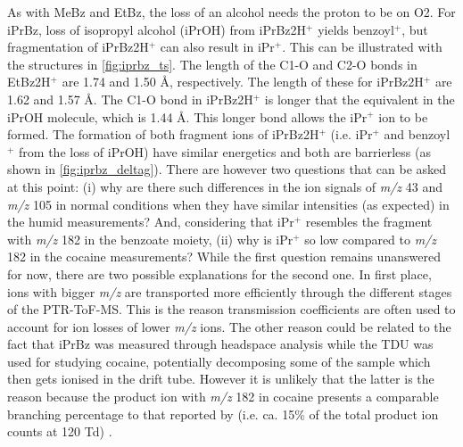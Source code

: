 

As with MeBz and EtBz, the loss of an alcohol needs the proton to be on O2.
%
For iPrBz, loss of isopropyl alcohol (iPrOH) from iPrBz2H$^+$ yields benzoyl$^+$, but fragmentation of iPrBz2H$^+$ can also result in iPr$^+$. 
%
This can be illustrated with the structures in \autoref{fig:iprbz_ts}.
%
The length of the C1-O and C2-O bonds in EtBz2H$^+$ are 1.74 and  1.50   \r{A}, respectively.
%
The length of these for iPrBz2H$^+$ are  1.62 and 1.57  \r{A}.
%
The C1-O bond in iPrBz2H$^+$ is longer that the equivalent in the iPrOH molecule, which is 1.44 \r{A}.
%
This longer bond allows the iPr$^+$ ion to be formed.
%
The formation of both fragment ions of iPrBz2H$^+$ (i.e. iPr$^+$ and benzoyl$^+$ from the loss of iPrOH) have similar energetics and both are barrierless (as shown in \autoref{fig:iprbz_deltag}).
%
There are however two questions that can be asked at this point:
%
(i) why are there such differences in the ion signals of \textit{m/z} 43 and \textit{m/z} 105 in normal conditions when they have similar intensities (as expected) in the humid measurements?
And, considering that  iPr$^+$ resembles the fragment with \textit{m/z} 182 in the benzoate moiety, (ii)  why is iPr$^+$ so low compared to \textit{m/z} 182 in the cocaine measurements?
%
While the first question remains unanswered for now, there are two possible explanations for the second one.
%
In first place, ions with bigger \textit{m/z} are transported more efficiently through the different stages of the PTR-ToF-MS.
%
This is the reason transmission coefficients are often used to account for ion losses of lower \textit{m/z} ions.
%
The other reason could be related to the fact that iPrBz was measured through headspace analysis while the TDU was used for studying cocaine, potentially decomposing some of the sample which then gets ionised in the drift tube.
%
However it is unlikely that the latter is the reason because the product ion with \textit{m/z} 182 in cocaine presents a comparable branching percentage to that reported by \citeauthor{Agarwal2011} (i.e. ca. 15\% of the total product ion counts at 120 Td)  \cite{Agarwal2011}.%






